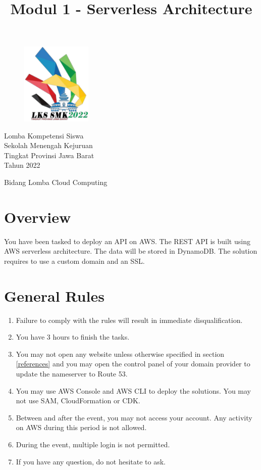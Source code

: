 \documentclass{article}
\title{Modul 1 - Serverless Architecture}
\author{}
\begin{document}
\lstset{language=Bash,upquote=true}
\begin{figure}[h]
\centering
\includegraphics[width=0.3\textwidth]{logo.png}
\end{figure}
\centering
{\huge
Lomba Kompetensi Siswa\\
Sekolah Menengah Kejuruan\\
Tingkat Provinsi Jawa Barat\\
Tahun 2022\\
\vspace{10mm} %
}
\vspace{30mm} %
{\let\newpage\relax\maketitle}
\vspace{30mm} %
{\LARGE Bidang Lomba Cloud Computing}

\raggedright
\newpage

\section{Overview}
You have been tasked to deploy an API on AWS. The REST API is built using AWS serverless architecture. The data will be stored in DynamoDB. The solution requires to use a custom domain and an SSL.
\section{General Rules}
\begin{enumerate}
    \item Failure to comply with the rules will result in immediate disqualification.
    \item You have 3 hours to finish the tasks.
    \item You may not open any website unless otherwise specified in section \ref{references} and you may open the control panel of your domain provider to update the nameserver to Route 53.
    \item You may use AWS Console and AWS CLI to deploy the solutions. You may not use SAM, CloudFormation or CDK.
    \item Between and after the event, you may not access your account. Any activity on AWS during this period is not allowed.
    \item During the event, multiple login is not permitted.
    \item If you have any question, do not hesitate to ask.
\end{enumerate}
\end{document}
